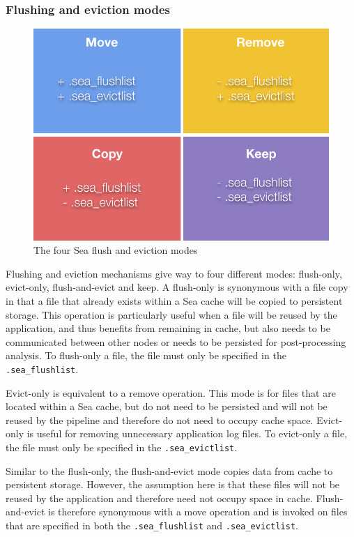 \documentclass[10pt,journal,compsoc]{IEEEtran}
\newcommand{\todo}[1]{\marginpar{\parbox{18mm}{\flushleft\tiny\color{red}\textbf{TODO}: #1}}}
\begin{document}
\subsubsection{Flushing and eviction modes}
\begin{figure}

    \centering
    \includegraphics[scale=0.8]{figures/sea-flushevict.pdf}%
\caption{The four Sea flush and eviction modes }
\label{fig:sea-comp:fe}
\end{figure}
Flushing and eviction mechanisms give way to four different modes: flush-only,
evict-only, flush-and-evict and keep. A flush-only is synonymous with a
file copy in that a file that already exists within a Sea cache will be copied
to persistent storage. This operation is particularly useful when a file will be
reused by the application, and thus benefits from remaining in cache, but also
needs to be communicated between other nodes or needs to be persisted for
post-processing analysis. To flush-only a file, the file must only be specified
in the \texttt{.sea\_flushlist}.

Evict-only is equivalent to a remove operation. This mode is for files that are located
within a Sea cache, but do not need to be persisted and will not be reused by
the pipeline and therefore do not need to occupy cache space. Evict-only is
useful for removing unnecessary application log files. To evict-only a file, the
file must only be specified in the \texttt{.sea\_evictlist}.

Similar to the flush-only, the flush-and-evict mode copies data from cache to
persistent storage. However, the assumption here is that these files will not be
reused by the application and therefore need not occupy space in cache.
Flush-and-evict is therefore synonymous with a move operation and is invoked on
files that are specified in both the \texttt{.sea\_flushlist} and \texttt{.sea\_evictlist}.
\end{document}
